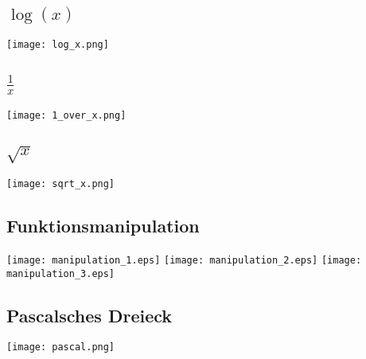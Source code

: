 \begin{landscape}\begin{multicols}{3}

\subsection{\texorpdfstring{$\log(x)$}{log(x)}}
\texttt{[image: log\_x.png]}

\subsection{\texorpdfstring{$\frac{1}{x}$}{1/x}}
\texttt{[image: 1\_over\_x.png]}

\subsection{\texorpdfstring{$\sqrt{x}$}{x^(1/x)}}
\texttt{[image: sqrt\_x.png]}

\subsection{Funktionsmanipulation}
\texttt{[image: manipulation\_1.eps]}
\texttt{[image: manipulation\_2.eps]}
\texttt{[image: manipulation\_3.eps]}

\subsection{Pascalsches Dreieck}
\texttt{[image: pascal.png]}

\end{multicols}\end{landscape}
